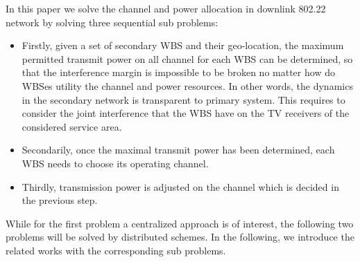 In this paper we solve the channel and power allocation in downlink 802.22 network by solving three sequential sub problems:
\begin{itemize}
\item  Firstly, given a set of secondary WBS and their geo-location, the maximum permitted transmit power on all channel for each WBS can be determined, so that the interference margin is impossible to be broken no matter how do WBSes utility the channel and power resources. 
In other words, the dynamics in the secondary network is transparent to primary system. 
This requires to consider the joint interference that the WBS have on the TV receivers of the considered service area. 
\item Secondarily, once the maximal transmit power has been determined, each WBS needs to choose its operating channel. 
\item Thirdly, transmission power is adjusted on the channel which is decided in the previous step.
\end{itemize}
While for the first problem a centralized approach is of interest, the following two problems will be solved by distributed schemes.
In the following, we introduce the related works with the corresponding sub problems.





